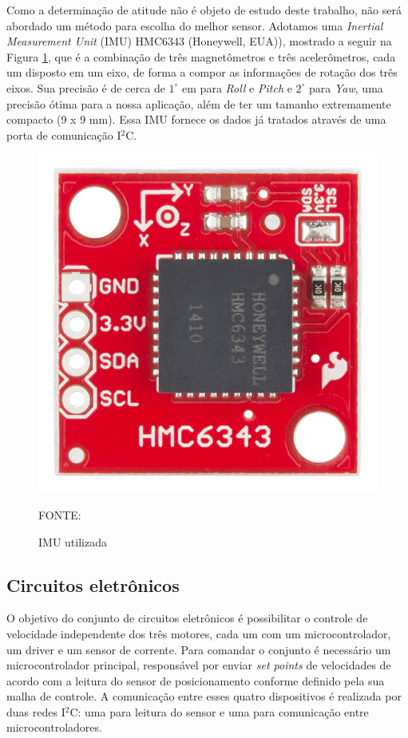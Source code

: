 \documentclass[
	12pt,				%
	openany,			%
	twoside,			%
	a4paper,			%
	english,			%
	french,				%
	spanish,			%
	brazil,				%
	oldfontcommands
	]{abntex2}
\begin{document}
Como a determinação de atitude não é objeto de estudo deste trabalho, não será abordado um método para escolha do melhor sensor. Adotamos uma \textit{Inertial Measurement Unit} (IMU) HMC6343 (Honeywell, EUA)), mostrado a seguir na Figura \ref{fig:IMU}, que é a combinação de três magnetômetros e três acelerômetros, cada um disposto em um eixo, de forma a compor as informações de rotação dos três eixos. Sua precisão é de cerca de $1^{\circ}$ em para \textit{Roll} e \textit{Pitch} e $2^{\circ}$ para \textit{Yaw}, uma precisão ótima para a nossa aplicação, além de ter um tamanho extremamente compacto (9 x 9 mm). Essa IMU fornece os dados já tratados através de uma porta de comunicação I$^{2}$C.

\begin{figure}[th]
	\caption{IMU utilizada}
	\centering
	\includegraphics[width=0.6\linewidth]{./figs/IMU-HMC6343}
	
	\begin{small}
		FONTE: \cite{IMU}
	\end{small}
	\label{fig:IMU}
\end{figure}

\subsection{Circuitos eletrônicos}

O objetivo do conjunto de circuitos eletrônicos é possibilitar o controle de velocidade independente dos três motores, cada um com um microcontrolador, um driver e um sensor de corrente. Para comandar o conjunto é necessário um microcontrolador principal, responsável por enviar \textit{set points} de velocidades de acordo com a leitura do sensor de posicionamento conforme definido pela sua malha de controle. A comunicação entre esses quatro dispositivos é realizada por duas redes I$^{2}$C: uma para leitura do sensor e uma para comunicação entre microcontroladores.
\end{document}
